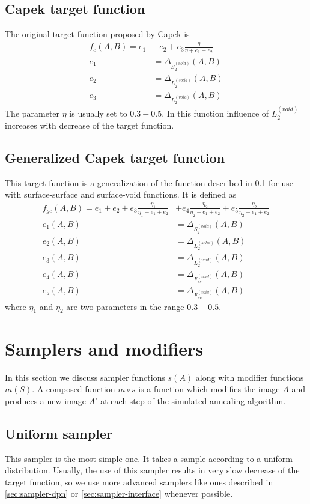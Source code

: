 \documentclass[preprint,amsmath,amssymb,aps,pre]{revtex4-1}
\begin{document}
\subsection{Capek target function}
\label{sec:target-capek}
The original target function proposed by Capek \cite{Capek-target} is
\begin{align*}
  f_c(A, B) = e_1 & + e_2 + e_3 \frac{\eta}{\eta + e_1 + e_2} \\
  e_1 & = \Delta_{S^{(void)}_2}(A, B) \\
  e_2 & = \Delta_{L^{(solid)}_2}(A, B) \\
  e_3 & = \Delta_{L^{(void)}_2}(A, B)
\end{align*}
The parameter $\eta$ is usually set to $0.3-0.5$. In this function influence of
$L_2^{(void)}$ increases with decrease of the target function.

\subsection{Generalized Capek target function}
\label{sec:target-capek-general}
This target function is a generalization of the function described in
\cref{sec:target-capek} for use with surface-surface and surface-void
functions. It is defined as
\begin{align*}
  f_{gc}(A, B) = e_1 + e_2 + e_3 \frac{\eta_1}{\eta_1 + e_1 + e_2} & + e_4
  \frac{\eta_2}{\eta_2 + e_1 + e_2} + e_5 \frac{\eta_2}{\eta_2 + e_1 + e_2} \\
  e_1(A, B) & = \Delta_{S^{(void)}_2}(A, B) \\
  e_2(A, B) & = \Delta_{L^{(solid)}_2}(A, B) \\
  e_3(A, B) & = \Delta_{L^{(void)}_2}(A, B) \\
  e_4(A, B) & = \Delta_{F^{(void)}_{ss}}(A, B) \\
  e_5(A, B) & = \Delta_{F^{(void)}_{sv}}(A, B)
\end{align*}
where $\eta_1$ and $\eta_2$ are two parameters in the range $0.3-0.5$.

\section{Samplers and modifiers}
\label{sec:samplers-mods}
In this section we discuss sampler functions $s(A)$ along with modifier
functions $m(S)$. A composed function $m \circ s$ is a function which modifies
the image $A$ and produces a new image $A'$ at each step of the simulated
annealing algorithm. 
\subsection{Uniform sampler}
\label{sec:sampler-uniform}
This sampler is the most simple one. It takes a sample according to a uniform
distribution. Usually, the use of this sampler results in very slow decrease of
the target function, so we use more advanced samplers like ones described in
\cref{sec:sampler-dpn} or \cref{sec:sampler-interface} whenever possible.
\end{document}
